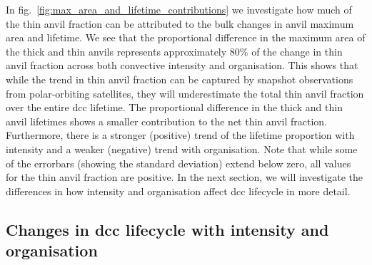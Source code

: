 In fig.~\ref{fig:max_area_and_lifetime_contributions} we investigate how much of the thin anvil fraction can be attributed to the bulk changes in anvil maximum area and lifetime.
We see that the proportional difference in the maximum area of the thick and thin anvils represents approximately 80\% of the change in thin anvil fraction across both convective intensity and organisation.
This shows that while the trend in thin anvil fraction can be captured by snapshot observations from polar-orbiting satellites, they will underestimate the total thin anvil fraction over the entire \acrshort{dcc} lifetime.
The proportional difference in the thick and thin anvil lifetimes shows a smaller contribution to the net thin anvil fraction.
Furthermore, there is a stronger (positive) trend of the lifetime proportion with intensity and a weaker (negative) trend with organisation.
Note that while some of the errorbars (showing the standard deviation) extend below zero, all values for the thin anvil fraction are positive.
In the next section, we will investigate the differences in how intensity and organisation affect \acrshort{dcc} lifecycle in more detail.



\subsection{Changes in \acrshort{dcc} lifecycle with intensity and organisation} \label{sec:lifecycle_results}

